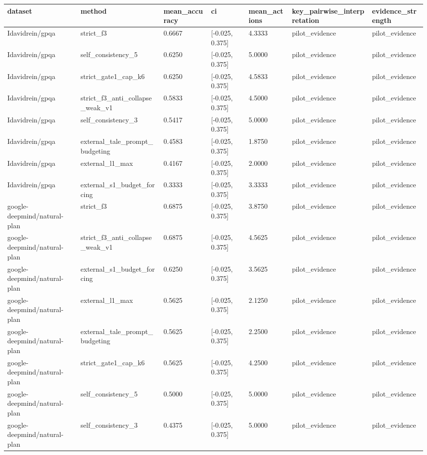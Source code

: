 \begin{tabular}{lllllll}
\hline
dataset & method & mean\_accuracy & ci & mean\_actions & key\_pairwise\_interpretation & evidence\_strength \\
\hline
Idavidrein/gpqa & strict\_f3 & 0.6667 & [-0.025, 0.375] & 4.3333 & pilot\_evidence & pilot\_evidence \\
Idavidrein/gpqa & self\_consistency\_5 & 0.6250 & [-0.025, 0.375] & 5.0000 & pilot\_evidence & pilot\_evidence \\
Idavidrein/gpqa & strict\_gate1\_cap\_k6 & 0.6250 & [-0.025, 0.375] & 4.5833 & pilot\_evidence & pilot\_evidence \\
Idavidrein/gpqa & strict\_f3\_anti\_collapse\_weak\_v1 & 0.5833 & [-0.025, 0.375] & 4.5000 & pilot\_evidence & pilot\_evidence \\
Idavidrein/gpqa & self\_consistency\_3 & 0.5417 & [-0.025, 0.375] & 5.0000 & pilot\_evidence & pilot\_evidence \\
Idavidrein/gpqa & external\_tale\_prompt\_budgeting & 0.4583 & [-0.025, 0.375] & 1.8750 & pilot\_evidence & pilot\_evidence \\
Idavidrein/gpqa & external\_l1\_max & 0.4167 & [-0.025, 0.375] & 2.0000 & pilot\_evidence & pilot\_evidence \\
Idavidrein/gpqa & external\_s1\_budget\_forcing & 0.3333 & [-0.025, 0.375] & 3.3333 & pilot\_evidence & pilot\_evidence \\
google-deepmind/natural-plan & strict\_f3 & 0.6875 & [-0.025, 0.375] & 3.8750 & pilot\_evidence & pilot\_evidence \\
google-deepmind/natural-plan & strict\_f3\_anti\_collapse\_weak\_v1 & 0.6875 & [-0.025, 0.375] & 4.5625 & pilot\_evidence & pilot\_evidence \\
google-deepmind/natural-plan & external\_s1\_budget\_forcing & 0.6250 & [-0.025, 0.375] & 3.5625 & pilot\_evidence & pilot\_evidence \\
google-deepmind/natural-plan & external\_l1\_max & 0.5625 & [-0.025, 0.375] & 2.1250 & pilot\_evidence & pilot\_evidence \\
google-deepmind/natural-plan & external\_tale\_prompt\_budgeting & 0.5625 & [-0.025, 0.375] & 2.2500 & pilot\_evidence & pilot\_evidence \\
google-deepmind/natural-plan & strict\_gate1\_cap\_k6 & 0.5625 & [-0.025, 0.375] & 4.2500 & pilot\_evidence & pilot\_evidence \\
google-deepmind/natural-plan & self\_consistency\_5 & 0.5000 & [-0.025, 0.375] & 5.0000 & pilot\_evidence & pilot\_evidence \\
google-deepmind/natural-plan & self\_consistency\_3 & 0.4375 & [-0.025, 0.375] & 5.0000 & pilot\_evidence & pilot\_evidence \\
\hline
\end{tabular}

